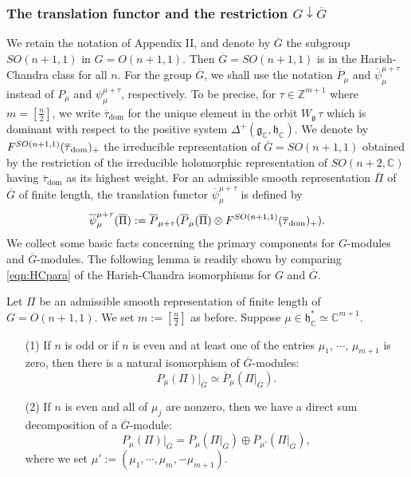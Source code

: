 \subsubsection{The translation functor and the restriction $G \downarrow \overline G$}
We retain the notation of Appendix II, 
 and denote by $\overline G$ the subgroup 
 $SO(n+1,1)$ in $G=O(n+1,1)$.  
Then $\overline G=SO(n+1,1)$ is in the Harish-Chandra class
 for all $n$.  
For the group $\overline G$,
 we shall use the notation
 $\overline P_{\mu}$ and $\overline{\psi}_{\mu}^{\mu+\tau}$ 
instead of $P_{\mu}$ and $\psi_{\mu}^{\mu+\tau}$, 
 respectively.   
To be precise,
 for $\tau \in {\mathbb{Z}}^{m+1}$ 
 where $m=[\frac n 2]$, 
 we write  $\overline \tau_{\operatorname{dom}}$ for the unique element
 in the orbit $W_{\mathfrak{g}}\, \tau$
 which is dominant with respect to the positive system
 $\Delta^+({\mathfrak{g}}_{\mathbb{C}}, {\mathfrak{h}}_{\mathbb{C}})$.  
We denote by $F^{{SO(n+1,1)}}({\overline \tau_{\operatorname{dom}}})_+$
 the irreducible representation of $\overline G=SO(n+1,1)$
 obtained by the restriction
 of the irreducible holomorphic representation of $SO(n+2,{\mathbb{C}})$
 having $\overline \tau_{\operatorname{dom}}$
 as its highest weight.  
For an admissible smooth representation $\overline \Pi$
 of $\overline G$ of finite length, 
 the translation functor $\overline \psi_{\mu}^{\mu+\tau}$
 is defined by
\begin{equation}
\label{eqn:transSO}
\overline \psi_{\mu}^{\mu+\tau}(\overline \Pi)
:=
\overline P_{\mu+\tau}
(\overline P_{\mu}(\overline \Pi) 
\otimes 
F^{{SO(n+1,1)}}({\overline \tau_{\operatorname{dom}}})_+).  
\end{equation}
We collect some basic facts concerning the primary components
 for $G$-modules and $\overline G$-modules. 
The following lemma is readily shown by comparing \eqref{eqn:HCpara}
 of the Harish-Chandra isomorphisms
 for $G$ and $\overline G$.  
\begin{lemma}
\label{lem:primary}
Let $\Pi$ be an admissible smooth representation
of finite length of $G=O(n+1,1)$.  
We set $m:=[\frac n 2]$ as before.  
Suppose $\mu \in {\mathfrak{h}}_{\mathbb{C}}^{\ast} 
\simeq {\mathbb{C}}^{m+1}$.  
\begin{enumerate}
\item[{\rm{(1)}}]
If $n$ is odd or if $n$ is even
 and at least one of the entries $\mu_1$, $\cdots$, $\mu_{m+1}$
 is zero, 
then there is a natural isomorphism of $\overline G$-modules:
\[
   P_{\mu}(\Pi)|_{\overline G} \simeq \overline P_{\mu}(\Pi|_{\overline G}).  
\]
\item[{\rm{(2)}}]
If $n$ is even
 and all of $\mu_j$ are nonzero, 
 then we have a direct sum decomposition of a $\overline G$-module:
\[
   P_{\mu}(\Pi)|_{\overline G}=\overline P_{\mu}(\Pi|_{\overline G}) \oplus 
\overline P_{\mu'}(\Pi|_{\overline G}), 
\]
where we set $\mu':=(\mu_1, \cdots, \mu_m, -\mu_{m+1})$.  
\end{enumerate}
\end{lemma}

